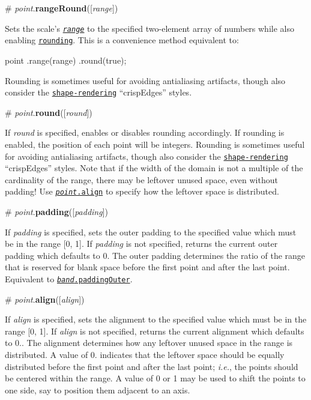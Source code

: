 \label{_point_rangeRound}%
\# {\itshape point}.{\bfseries range\+Round}(\mbox{[}{\itshape range}\mbox{]})

Sets the scale’s \href{#point_range}{\tt {\itshape range}} to the specified two-\/element array of numbers while also enabling \href{#point_round}{\tt rounding}. This is a convenience method equivalent to\+:


\begin{DoxyCode}
point
    .range(range)
    .round(true);
\end{DoxyCode}


Rounding is sometimes useful for avoiding antialiasing artifacts, though also consider the \href{https://developer.mozilla.org/en-US/docs/Web/SVG/Attribute/shape-rendering}{\tt shape-\/rendering} “crisp\+Edges” styles.

\label{_point_round}%
\# {\itshape point}.{\bfseries round}(\mbox{[}{\itshape round}\mbox{]})

If {\itshape round} is specified, enables or disables rounding accordingly. If rounding is enabled, the position of each point will be integers. Rounding is sometimes useful for avoiding antialiasing artifacts, though also consider the \href{https://developer.mozilla.org/en-US/docs/Web/SVG/Attribute/shape-rendering}{\tt shape-\/rendering} “crisp\+Edges” styles. Note that if the width of the domain is not a multiple of the cardinality of the range, there may be leftover unused space, even without padding! Use \href{#point_align}{\tt {\itshape point}.align} to specify how the leftover space is distributed.

\label{_point_padding}%
\# {\itshape point}.{\bfseries padding}(\mbox{[}{\itshape padding}\mbox{]})

If {\itshape padding} is specified, sets the outer padding to the specified value which must be in the range \mbox{[}0, 1\mbox{]}. If {\itshape padding} is not specified, returns the current outer padding which defaults to 0. The outer padding determines the ratio of the range that is reserved for blank space before the first point and after the last point. Equivalent to \href{#band_paddingOuter}{\tt {\itshape band}.padding\+Outer}.

\label{_point_align}%
\# {\itshape point}.{\bfseries align}(\mbox{[}{\itshape align}\mbox{]})

If {\itshape align} is specified, sets the alignment to the specified value which must be in the range \mbox{[}0, 1\mbox{]}. If {\itshape align} is not specified, returns the current alignment which defaults to 0.. The alignment determines how any leftover unused space in the range is distributed. A value of 0. indicates that the leftover space should be equally distributed before the first point and after the last point; {\itshape i.\+e.}, the points should be centered within the range. A value of 0 or 1 may be used to shift the points to one side, say to position them adjacent to an axis.

